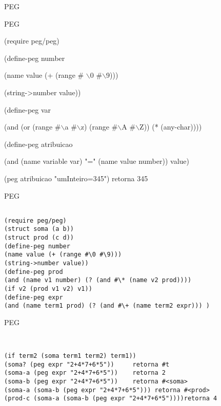 \documentclass{beamer}
\begin{document}


\begin{frame}[fragile]{PEG}

PEG

(require peg/peg)

(define-peg number

            (name value (+ (range \# $\backslash$0 \#$\backslash$9)))
            
            (string->number value))
            
(define-peg var

            (and (or (range \#$\backslash$a \#$\backslash$z) (range \#$\backslash$A \#$\backslash$Z)) (* (any-char))))
            

(define-peg atribuicao

            (and (name variable var) "=" (name value number)) value)
            
(peg atribuicao "umInteiro=345") retorna 345

\end{frame}



\begin{frame}[fragile]{PEG}
\begin{verbatim}

(require peg/peg)
(struct soma (a b))
(struct prod (c d))
(define-peg number
(name value (+ (range #\0 #\9)))
(string->number value))
(define-peg prod
(and (name v1 number) (? (and #\* (name v2 prod))))
(if v2 (prod v1 v2) v1))
(define-peg expr
(and (name term1 prod) (? (and #\+ (name term2 expr))) )

\end{verbatim}
\end{frame}


\begin{frame}[fragile]{PEG}
\begin{verbatim}


(if term2 (soma term1 term2) term1))
(soma? (peg expr "2+4*7+6*5"))     retorna #t
(soma-a (peg expr "2+4*7+6*5"))    retorna 2
(soma-b (peg expr "2+4*7+6*5"))    retorna #<soma>
(soma-a (soma-b (peg expr "2+4*7+6*5"))) retorna #<prod>
(prod-c (soma-a (soma-b (peg expr "2+4*7+6*5"))))retorna 4
\end{verbatim}
\end{frame}

\end{document}
